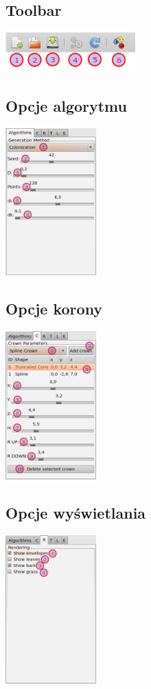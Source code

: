 \subsection{Toolbar}
\includegraphics[width=50mm]{images/gui/toolbar.png}

\subsection{Opcje algorytmu}
\includegraphics[width=35mm]{images/gui/algorithms_panel.png}


\subsection{Opcje korony}
\includegraphics[width=35mm]{images/gui/crown_panel.png}


\subsection{Opcje wyświetlania}
\includegraphics[width=35mm]{images/gui/rendering_panel.png}


